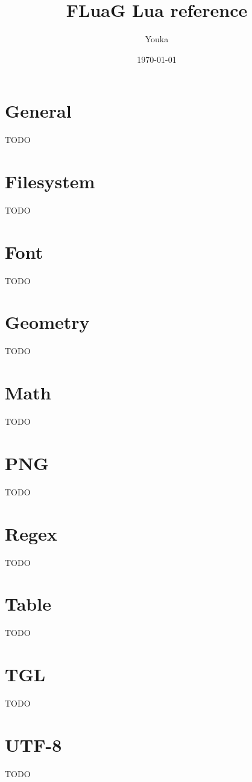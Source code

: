 \documentclass[12pt]{article}
\title{FLuaG Lua reference}
\author{Youka}
\date{\today}
\begin{document}
\maketitle
\tableofcontents

\section{General}
\label{sec:general}

TODO

\section{Filesystem}
\label{sec:filesystem}

TODO

\section{Font}
\label{sec:font}

TODO

\section{Geometry}
\label{sec:geometry}

TODO

\section{Math}
\label{sec:math}

TODO

\section{PNG}
\label{sec:png}

TODO

\section{Regex}
\label{sec:regex}

TODO

\section{Table}
\label{sec:table}

TODO

\section{TGL}
\label{sec:tgl}

TODO

\section{UTF-8}
\label{sec:utf8}

TODO
\end{document}

